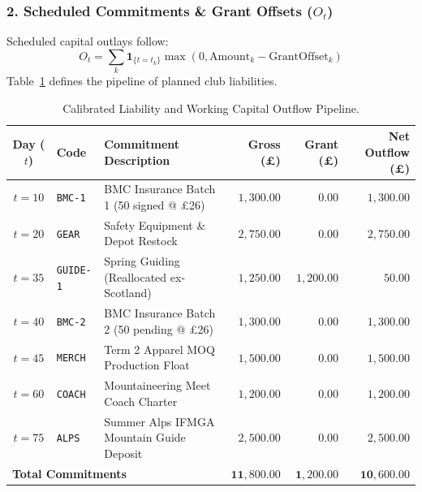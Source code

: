 \documentclass[11pt,a4paper]{article}
\begin{document}
\subsubsection{2. Scheduled Commitments \& Grant Offsets ($O_t$)}
Scheduled capital outlays follow:
\begin{equation}
O_t = \sum_{k} \mathbf{1}_{\{t = t_k\}} \max\left(0, \text{Amount}_k - \text{GrantOffset}_k\right)
\end{equation}
Table~\ref{tab:commitments} defines the pipeline of planned club liabilities.

\begin{table}[htbp]
\centering
\small
\begin{tabularx}{\textwidth}{c l X r r r}
\toprule
\textbf{Day ($t$)} & \textbf{Code} & \textbf{Commitment Description} & \textbf{Gross (\pounds)} & \textbf{Grant (\pounds)} & \textbf{Net Outflow (\pounds)} \\
\midrule
$t = 10$ & \texttt{BMC-1}  & BMC Insurance Batch 1 (50 signed @ \pounds 26) & $1,300.00$ & $0.00$ & $1,300.00$ \\
$t = 20$ & \texttt{GEAR}   & Safety Equipment \& Depot Restock       & $2,750.00$ & $0.00$ & $2,750.00$ \\
$t = 35$ & \texttt{GUIDE-1}& Spring Guiding (Reallocated ex-Scotland)& $1,250.00$ & $1,200.00$& $50.00$ \\
$t = 40$ & \texttt{BMC-2}  & BMC Insurance Batch 2 (50 pending @ \pounds 26)& $1,300.00$ & $0.00$ & $1,300.00$ \\
$t = 45$ & \texttt{MERCH}  & Term 2 Apparel MOQ Production Float     & $1,500.00$ & $0.00$ & $1,500.00$ \\
$t = 60$ & \texttt{COACH}  & Mountaineering Meet Coach Charter       & $1,200.00$ & $0.00$ & $1,200.00$ \\
$t = 75$ & \texttt{ALPS}   & Summer Alps IFMGA Mountain Guide Deposit& $2,500.00$ & $0.00$ & $2,500.00$ \\
\midrule
\multicolumn{3}{l}{\textbf{Total Commitments}} & $\mathbf{11,800.00}$ & $\mathbf{1,200.00}$ & $\mathbf{10,600.00}$ \\
\bottomrule
\end{tabularx}
\caption{Calibrated Liability and Working Capital Outflow Pipeline.}
\label{tab:commitments}
\end{table}
\end{document}
